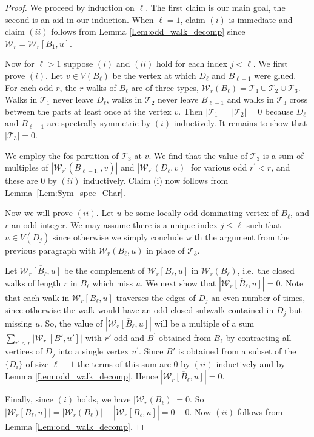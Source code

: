 \documentclass[11pt]{article}
\theoremstyle{plain}
\newcommand{\ssym}[0]{spectrally symmetric }
\newcommand{\W}[0]{\mathcal{W}}
\newcommand{\T}[0]{\mathcal{T}}
\begin{document}
\begin{proof}
We proceed by induction on $\ell$. The first claim is our main goal, the second is an aid in our induction. When $\ell=1$, claim $(i)$ is immediate and claim $(ii)$ follows from Lemma \ref{Lem:odd_walk_decomp} since $\W_r=\W_r[B_1,u]$. 

Now for $\ell>1$ suppose $(i)$ and $(ii)$ hold for each index $j<\ell$. We first prove $(i)$. Let  $v\in V(B_\ell)$ be the vertex at which $D_\ell$ and $B_{\ell-1}$ were glued. For each odd $r$, the $r$-walks of $B_\ell$ are of three types, $\W_r(B_\ell)=\T_1\cup \T_2\cup \T_3$. Walks in $\T_1$ never leave $D_\ell$, walks in $\T_2$ never leave $B_{\ell-1}$ and walks in $\T_3$ cross between the parts at least once at the vertex $v$. Then $|\T_1|=|\T_2|=0$ because $D_\ell$ and $B_{\ell-1}$ are \ssym by $(i)$ inductively. It remains to show that $|\T_3|=0$. 

We employ the fos-partition of $\T_3$ at $v$. We find that the value of $\T_3$ is a sum of multiples of $|\W_{r^\prime}(B_{\ell-1,},v)|$ and $|\W_{r^\prime}(D_{\ell},v)|$ for various odd $r^\prime<r$, and these are $0$ by $(ii)$ inductively. Claim (i) now follows from Lemma~\ref{Lem:Sym_spec_Char}.

Now we will prove $(ii)$. Let $u$ be some locally odd dominating vertex of $B_\ell$, and $r$ an odd integer. We may assume there is a unique index $j\leq \ell$ such that $u\in V(D_j)$ since otherwise we simply conclude with the argument from the previous paragraph with $\W_r(B_\ell,u)$ in place of $\T_3$.

Let $\overline{\W_r[B_\ell,u]}$ be the complement of $\W_r[B_\ell,u]$ in $\W_r(B_\ell)$, i.e.~the closed walks of length $r$ in $B_\ell$ which miss $u$. We next show that $|\overline{\W_r[B_\ell,u]}|=0$. Note that each walk in $\overline{\W_r[B_\ell,u]}$ traverses the edges of $D_j$ an even number of times, since otherwise the walk would have an odd closed subwalk contained in $D_j$ but missing $u$. So, the value of $|\overline{\W_r[B_\ell,u]}|$ will be a multiple of a sum $\sum_{r'<r}|\W_{r'}[B',u']|$ with $r'$ odd and $B^\prime$ obtained from $B_\ell$ by contracting all vertices of $D_j$ into a single vertex $u^\prime$. Since $B'$ is obtained from a subset of the $\{D_i\}$ of size $\ell-1$ the terms of this sum are $0$ by $(ii)$ inductively and by Lemma \ref{Lem:odd_walk_decomp}. Hence $|\overline{\W_r[B_\ell,u]}|=0$. 

 
Finally, since $(i)$ holds, we have  $|\W_r(B_\ell)|=0$. So~$|\W_r[B_\ell,u]|=|\W_r(B_\ell)|-|\overline{\W_r[B_\ell,u]}|=0-0$. Now $(ii)$ follows from Lemma \ref{Lem:odd_walk_decomp}.
\end{proof}
\end{document}
